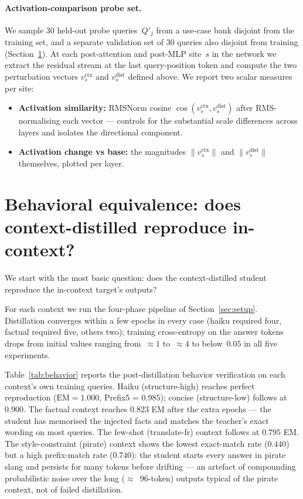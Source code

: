 \documentclass{article}
\begin{document}
\paragraph{Activation-comparison probe set.}
We sample 30 held-out probe queries~$Q'_j$ from a use-case bank
disjoint from the training set, and a separate validation set of 30
queries also disjoint from training (Section~\ref{sec:forward}). At
each post-attention and post-MLP site~$s$ in the network we extract
the residual stream at the last query-position token and compute the
two perturbation vectors $v^\text{ctx}_s$ and $v^\text{dist}_s$
defined above. We report two scalar measures per site:
\begin{itemize}
\item \textbf{Activation similarity:} RMSNorm cosine
  $\cos(v^\text{ctx}_s, v^\text{dist}_s)$ after RMS-normalising each
  vector --- controls for the substantial scale differences across
  layers and isolates the directional component.
\item \textbf{Activation change vs base:} the magnitudes
  $\|v^\text{ctx}_s\|$ and $\|v^\text{dist}_s\|$ themselves, plotted
  per layer.
\end{itemize}

\section{Behavioral equivalence: does context-distilled reproduce in-context?}
\label{sec:forward}

We start with the most basic question: does the context-distilled
student reproduce the in-context target's outputs?

For each context we run the four-phase pipeline of
Section~\ref{sec:setup}. Distillation converges within a few epochs in
every case (haiku required four, factual required five, others two);
training cross-entropy on the answer tokens drops from initial values
ranging from~$\approx 1$ to~$\approx 4$ to below~$0.05$ in all five
experiments.

Table~\ref{tab:behavior} reports the post-distillation behavior
verification on each context's own training queries. Haiku
(structure-high) reaches perfect reproduction
($\mathrm{EM} = 1.000$, Prefix5 = $0.985$); concise (structure-low)
follows at $0.900$. The factual context reaches $0.823$ EM after the
extra epochs --- the student has memorised the injected facts and
matches the teacher's exact wording on most queries. The few-shot
(translate-fr) context follows at $0.795$ EM. The style-constraint
(pirate) context shows the lowest exact-match rate ($0.440$) but a
high prefix-match rate ($0.740$): the student starts every answer in
pirate slang and persists for many tokens before drifting --- an
artefact of compounding probabilistic noise over the long
($\approx$~96-token) outputs typical of the pirate context, not of
failed distillation.
\end{document}
